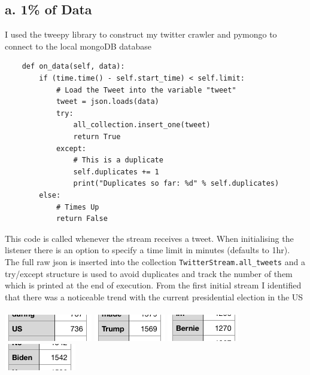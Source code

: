 \documentclass[10pt,a4paper]{article}
\begin{document}
	\subsection*{a. 1\% of Data}
	I used the tweepy library to construct my twitter crawler and pymongo to connect to the local mongoDB database
	\begin{verbatim}
    def on_data(self, data):
        if (time.time() - self.start_time) < self.limit:
            # Load the Tweet into the variable "tweet"
            tweet = json.loads(data)
            try:
                all_collection.insert_one(tweet)
                return True
            except:
                # This is a duplicate
                self.duplicates += 1
                print("Duplicates so far: %d" % self.duplicates)
        else:
            # Times Up
            return False
	\end{verbatim}
	This code is called whenever the stream receives a tweet. When initialising the listener there is an option to specify a time limit in minutes (defaults to 1hr). The full raw json is inserted into the collection \verb|TwitterStream.all_tweets| and a try/except structure is used to avoid duplicates and track the number of them which is printed at the end of execution.
	From the first initial stream I identified that there was a noticeable trend with the current presidential election in the US \\ \\
	\includegraphics[scale=1]{images/US.png}
	\includegraphics[scale=1]{images/trump.png} 
	\includegraphics[scale=1]{images/bernie.png}
	\includegraphics[scale=1]{images/biden.png} 
	
\end{document}
